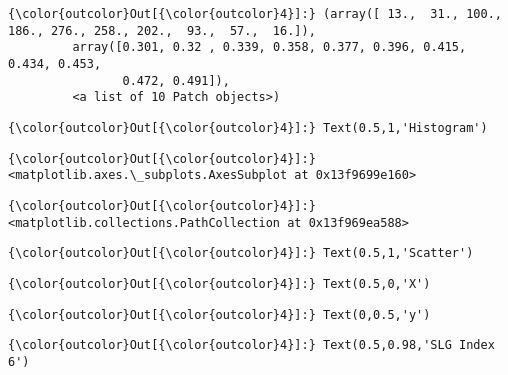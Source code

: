 \documentclass[11pt]{article}
\begin{document}
\begin{Verbatim}[commandchars=\\\{\}]
{\color{outcolor}Out[{\color{outcolor}4}]:} (array([ 13.,  31., 100., 186., 276., 258., 202.,  93.,  57.,  16.]),
         array([0.301, 0.32 , 0.339, 0.358, 0.377, 0.396, 0.415, 0.434, 0.453,
                0.472, 0.491]),
         <a list of 10 Patch objects>)
\end{Verbatim}
            
\begin{Verbatim}[commandchars=\\\{\}]
{\color{outcolor}Out[{\color{outcolor}4}]:} Text(0.5,1,'Histogram')
\end{Verbatim}
            
\begin{Verbatim}[commandchars=\\\{\}]
{\color{outcolor}Out[{\color{outcolor}4}]:} <matplotlib.axes.\_subplots.AxesSubplot at 0x13f9699e160>
\end{Verbatim}
            
\begin{Verbatim}[commandchars=\\\{\}]
{\color{outcolor}Out[{\color{outcolor}4}]:} <matplotlib.collections.PathCollection at 0x13f969ea588>
\end{Verbatim}
            
\begin{Verbatim}[commandchars=\\\{\}]
{\color{outcolor}Out[{\color{outcolor}4}]:} Text(0.5,1,'Scatter')
\end{Verbatim}
            
\begin{Verbatim}[commandchars=\\\{\}]
{\color{outcolor}Out[{\color{outcolor}4}]:} Text(0.5,0,'X')
\end{Verbatim}
            
\begin{Verbatim}[commandchars=\\\{\}]
{\color{outcolor}Out[{\color{outcolor}4}]:} Text(0,0.5,'y')
\end{Verbatim}
            
\begin{Verbatim}[commandchars=\\\{\}]
{\color{outcolor}Out[{\color{outcolor}4}]:} Text(0.5,0.98,'SLG Index 6')
\end{Verbatim}
            
\end{document}
